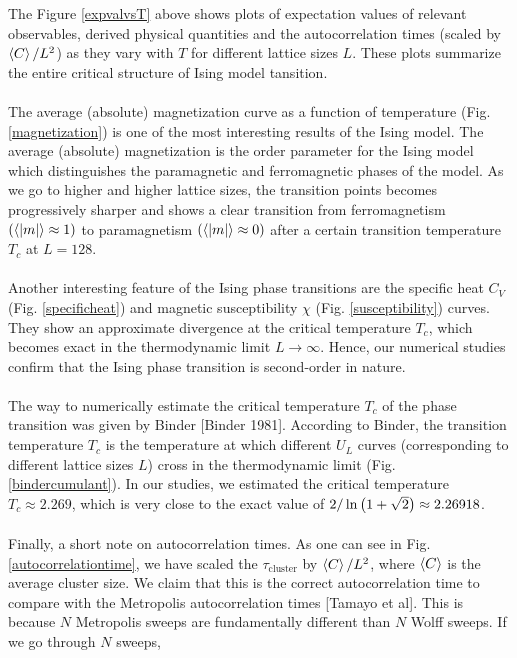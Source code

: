 \documentclass[../journal_main.tex]{subfiles}
\begin{document}
\FloatBarrier \!\!\!\!\!\!\!\!\!\!\!\!
The Figure \ref{expvalvsT} above shows plots of expectation values of relevant observables, derived physical quantities and the autocorrelation times (scaled by $\expval{C}/L^2$) as they vary with $T$ for different lattice sizes $L$. These plots summarize the entire critical structure of Ising model tansition.~\\~\\
The average (absolute) magnetization curve as a function of temperature (Fig. \ref{magnetization}) is one of the most interesting results of the Ising model. The average (absolute) magnetization is the order parameter for the Ising model which distinguishes the paramagnetic and ferromagnetic phases of the model. As we go to higher and higher lattice sizes, the transition points becomes progressively sharper and shows a clear transition from ferromagnetism $(\expval{|m|} \approx 1)$ to paramagnetism $(\expval{|m|} \approx 0)$ after a certain transition temperature $T_c$ at $L = 128$.~\\~\\
Another interesting feature of the Ising phase transitions are the specific heat $C_V$ (Fig. \ref{specificheat}) and magnetic susceptibility $\chi$ (Fig. \ref{susceptibility}) curves. They show an approximate divergence at the critical temperature $T_c$, which becomes exact in the thermodynamic limit $L \to \infty$. Hence, our numerical studies confirm that the Ising phase transition is second-order in nature.~\\~\\
The way to numerically estimate the critical temperature $T_c$ of the phase transition was given by Binder [Binder 1981]. According to Binder, the transition temperature $T_c$ is the temperature at which different $U_L$ curves (corresponding to different lattice sizes $L$) cross in the thermodynamic limit (Fig. \ref{bindercumulant}). In our studies, we estimated the critical temperature $T_c \approx 2.269$, which is very close to the exact value of $2/\ln\qty(1+\sqrt{2}) \approx 2.26918$.~\\~\\
Finally, a short note on autocorrelation times. As one can see in Fig. \ref{autocorrelationtime}, we have scaled the $\tau_\text{cluster}$ by $\expval{C}/L^2$, where $\expval{C}$ is the average cluster size. We claim that this is the correct autocorrelation time to compare with the Metropolis autocorrelation times [Tamayo et al]. This is because $N$ Metropolis sweeps are fundamentally different than $N$ Wolff sweeps. If we go through $N$ sweeps, 
\end{document}
